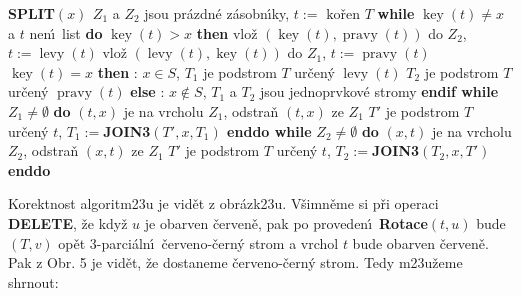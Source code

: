 \documentclass[a4paper,12pt]{article}
\DeclareMathOperator*{\levy}{levy}
\DeclareMathOperator*{\pravy}{pravy}
\DeclareMathOperator*{\key}{key}
\begin{document}
{\bf SPLIT$(x)$\newline 
$Z_1$} a $Z_2$ jsou pr\'azdn\'e z\'asobn\'\i ky, $t:=\text{ ko\v ren }T$\newline 
{\bf while} $\key(t)\ne x$ a $t$ nen\'\i\ list {\bf do}\newline 
\phantom{---}{\bf if} $\key(t)>x$ {\bf then}\newline 
\phantom{------}vlo\v z $(\key(t),\pravy(t))$ do $Z_2$, $t:=\levy(t)$ \newline 
\phantom{---}{\bf else}\newline 
\phantom{------}vlo\v z $(\levy(t),\key(t))$ do $Z_1$, $t:=\pravy(t)$ \newline 
\phantom{---}{\bf endif\newline 
enddo \newline 
if} $\key(t)=x$ {\bf then}\newline 
\phantom{---}{\bf V\'ystup}: $x\in S$, $T_1$ je podstrom $T$ ur\v cen\'y $\levy(t)$ \newline 
\phantom{---}$T_2$ je podstrom $T$ ur\v cen\'y $\pravy(t)$ \newline 
{\bf else}\newline 
\phantom{---}{\bf V\'ystup}: $x\notin S$, $T_1$ a $T_2$ jsou jednoprvkov\'e stromy\newline 
{\bf endif \newline 
while} $Z_1\ne\emptyset$ {\bf do}\newline 
\phantom{---}$(t,x)$ je na vrcholu $Z_1$, odstra\v n $(t,x)$ ze $Z_1$ \newline 
\phantom{---}$T'$ je podstrom $T$ ur\v cen\'y $t$, $T_1:=${\bf JOIN3$(T',x,T_1
)$ \newline 
enddo\newline 
while} $Z_2\ne\emptyset$ {\bf do}\newline 
\phantom{---}$(x,t)$ je na vrcholu $Z_2$, odstra\v n $(x,t)$ ze $Z_1$ \newline 
\phantom{---}$T'$ je podstrom $T$ ur\v cen\'y $t$, $T_2:=${\bf JOIN3$(T_2,x,T'
)$ \newline 
enddo}
\medskip

\flushpar Korektnost algoritm\accent23u je vid\v et z 
obr\'azk\accent23u. V\v simn\v eme si p\v ri ope\-raci {\bf DELETE}, \v ze kdy\v z $
u$ je 
obarven \v cerven\v e, pak po proveden\'\i\ {\bf Rotace$(t,u)$} bude $
(T,v)$ op\v et 
3-parci\'aln\'\i\ \v cerveno-\v cern\'y strom a vrchol $t$ bude obarven \v cerven\v e.  
Pak z Obr.  5 je vid\v et, \v ze dostaneme \v cerveno-\v cern\'y 
strom. Tedy m\accent23u\v zeme shrnout:
\end{document}
